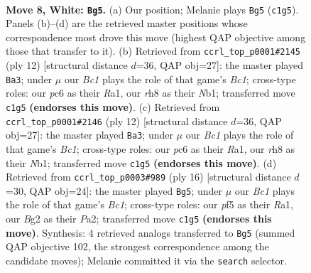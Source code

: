 \documentclass[11pt]{article}
\begin{document}
\begin{figure}[p]\centering
\begin{subfigure}{0.46\textwidth}\centering
\resizebox{\linewidth}{!}{%
\newchessgame
\chessboard[
  setfen={rnbqk2r/pp4pp/2pb1n2/3p1p2/3P4/5NP1/PP2PPBP/RNBQ1RK1 w kq - 0 8},
  showmover=false,
  pgfstyle=straightmove, color=movearrow, markmove={c1-g5}
]}
\caption{}
\end{subfigure}\hfill
\begin{subfigure}{0.46\textwidth}\centering
\resizebox{\linewidth}{!}{%
\newchessgame
\chessboard[
  setfen={rnbqk2r/pp4pp/2pbpn2/3p1p2/3P4/1P3NP1/P1P1PPBP/RNBQ1RK1 w kq - 2 7},
  showmover=false,
  pgfstyle=straightmove, color=movearrow, markmove={c1-a3}
]}
\caption{}
\end{subfigure}
\\[4pt]
\begin{subfigure}{0.46\textwidth}\centering
\resizebox{\linewidth}{!}{%
\newchessgame
\chessboard[
  setfen={rnbqk2r/pp4pp/2pbpn2/3p1p2/3P4/1P3NP1/P1P1PPBP/RNBQ1RK1 w kq - 2 7},
  showmover=false,
  pgfstyle=straightmove, color=movearrow, markmove={c1-a3}
]}
\caption{}
\end{subfigure}\hfill
\begin{subfigure}{0.46\textwidth}\centering
\resizebox{\linewidth}{!}{%
\newchessgame
\chessboard[
  setfen={r1bqk2r/pp3ppp/2nbpn2/8/2Pp4/3P1NP1/PP3PBP/RNBQ1RK1 w kq - 1 9},
  showmover=false,
  pgfstyle=straightmove, color=movearrow, markmove={c1-g5}
]}
\caption{}
\end{subfigure}
\caption{\textbf{Move 8, White: \texttt{Bg5}.} (a) Our position; Melanie plays \texttt{Bg5} (\texttt{c1g5}). Panels (b)--(d) are the retrieved master positions whose correspondence most drove this move (highest QAP objective among those that transfer to it). (b) Retrieved from \texttt{ccrl\_top\_p0001\#2145} (ply 12) [structural distance $d$=36, QAP obj=27]: the master played \texttt{Ba3}; under $\mu$ our \emph{Bc1} plays the role of that game's \emph{Bc1}; cross-type roles: our \emph{p}c6 as their \emph{R}a1, our \emph{r}h8 as their \emph{N}b1; transferred move \texttt{c1g5} \textbf{(endorses this move)}. (c) Retrieved from \texttt{ccrl\_top\_p0001\#2146} (ply 12) [structural distance $d$=36, QAP obj=27]: the master played \texttt{Ba3}; under $\mu$ our \emph{Bc1} plays the role of that game's \emph{Bc1}; cross-type roles: our \emph{p}c6 as their \emph{R}a1, our \emph{r}h8 as their \emph{N}b1; transferred move \texttt{c1g5} \textbf{(endorses this move)}. (d) Retrieved from \texttt{ccrl\_top\_p0003\#989} (ply 16) [structural distance $d$=30, QAP obj=24]: the master played \texttt{Bg5}; under $\mu$ our \emph{Bc1} plays the role of that game's \emph{Bc1}; cross-type roles: our \emph{p}f5 as their \emph{R}a1, our \emph{B}g2 as their \emph{P}a2; transferred move \texttt{c1g5} \textbf{(endorses this move)}. Synthesis: 4 retrieved analogs transferred to \texttt{Bg5} (summed QAP objective 102, the strongest correspondence among the candidate moves); Melanie committed it via the \texttt{search} selector.}
\label{fig:thought-m14}
\end{figure}
\end{document}
